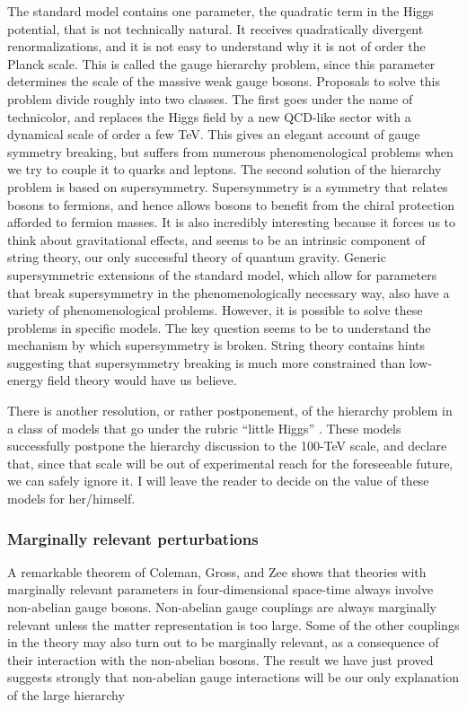 The standard model contains one parameter, the quadratic term in the Higgs
potential, that is not technically natural. It receives quadratically
divergent renormalizations, and it is not easy to understand why it is not of
order the Planck scale. This is called the gauge hierarchy problem, since this
parameter determines the scale of the massive weak gauge bosons. Proposals to
solve this problem divide roughly into two classes. The first goes under the
name of technicolor, and replaces the Higgs field by a new QCD-like sector with
a dynamical scale of order a few TeV. This gives an elegant account of gauge
symmetry breaking, but suffers from numerous phenomenological problems when we
try to couple it to quarks and leptons. The second solution of the hierarchy
problem is based on supersymmetry. Supersymmetry is a symmetry that relates
bosons to fermions, and hence allows bosons to benefit from the chiral
protection afforded to fermion masses. It is also incredibly interesting because
it forces us to think about gravitational effects, and seems to be an intrinsic
component of string theory, our only successful theory of quantum gravity.
Generic supersymmetric extensions of the standard model, which allow for
parameters that break supersymmetry in the phenomenologically necessary way,
also have a variety of phenomenological problems. However, it is possible to
solve these problems in specific models. The key question seems to be to
understand the mechanism by which supersymmetry is broken. String theory
contains hints suggesting that supersymmetry breaking is much more constrained
than low-energy field theory would have us believe.

There is another resolution, or rather postponement, of the hierarchy problem
in a class of models that go under the rubric ``little Higgs''
\cite{banks-ref-119}. These models successfully postpone the hierarchy
discussion to the 100-TeV scale, and declare that, since that scale will be out
of experimental reach for the foreseeable future, we can safely ignore it. I
will leave the reader to decide on the value of these models for her/himself.

\subsubsection{Marginally relevant perturbations}

A remarkable theorem of Coleman, Gross, and Zee \cite{banks-ref-120,banks-ref-121,banks-ref-122}
shows that theories with marginally relevant parameters in four-dimensional
space-time always involve non-abelian gauge bosons. Non-abelian gauge couplings
are always marginally relevant unless the matter representation is too large.
Some of the other couplings in the theory may also turn out to be marginally
relevant, as a consequence of their interaction with the non-abelian bosons.
The result we have just proved suggests strongly that non-abelian gauge
interactions will be our only explanation of the large hierarchy

